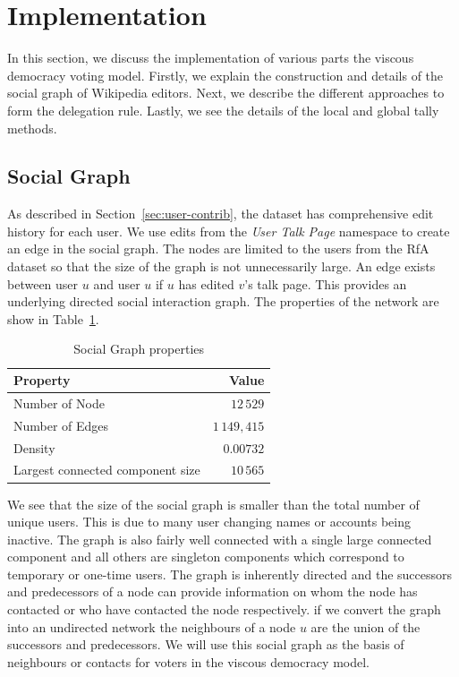 \section{Implementation}
\label{sec:implementation}
In this section, we discuss the implementation of various parts the viscous democracy voting model. Firstly, we explain the construction and details of the social graph of Wikipedia editors. Next, we describe the different approaches to form the delegation rule. Lastly, we see the details of the local and global tally methods.

\subsection{Social Graph}
As described in Section~\ref{sec:user-contrib}, the \usercontrib dataset has comprehensive edit history for each user. We use edits from the \textit{User Talk Page} namespace to create an edge in the social graph. The nodes are limited to the users from the RfA dataset so that the size of the graph is not unnecessarily large. An edge exists between user $u$ and user $u$ if $u$ has edited $v$'s talk page. This provides an underlying directed social interaction graph. The properties of the network are show in Table~\ref{tab:social-graph}.

\begin{table}
    \centering
    \begin{tabular}{lr}
        \toprule
        \textbf{Property}& \textbf{Value} \\
        \midrule
        Number of Node & $12\,529$ \\
        Number of Edges & $1\,149,415$ \\
        Density & $0.00732$\\
        Largest connected component size &$10\,565$\\
        \bottomrule
    \end{tabular}
    \caption{Social Graph properties}
    \label{tab:social-graph}
\end{table}

We see that the size of the social graph is smaller than the total number of unique users. This is due to many user changing names or accounts being inactive. The graph is also fairly well connected with a single large connected component and all others are singleton components which correspond to temporary or one-time users. The graph is inherently directed and the successors and predecessors of a node can provide information on whom the node has contacted or who have contacted the node respectively. if we convert the graph into an undirected network the neighbours of a node $u$ are the union of the successors and predecessors. We will use this social graph as the basis of neighbours or contacts for voters in the viscous democracy model.

